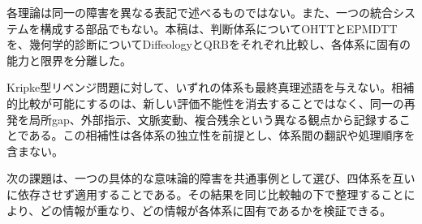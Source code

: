 \documentclass[a4paper,11pt]{ltjsarticle}
\theoremstyle{definition}
\theoremstyle{plain}
\begin{document}
各理論は同一の障害を異なる表記で述べるものではない。また、一つの統合システムを構成する部品でもない。本稿は、判断体系についてOHTTとEPMDTTを、幾何学的診断についてDiffeologyとQRBをそれぞれ比較し、各体系に固有の能力と限界を分離した。

Kripke型リベンジ問題に対して、いずれの体系も最終真理述語を与えない。相補的比較が可能にするのは、新しい評価不能性を消去することではなく、同一の再発を局所gap、外部指示、文脈変動、複合残余という異なる観点から記録することである。この相補性は各体系の独立性を前提とし、体系間の翻訳や処理順序を含まない。

次の課題は、一つの具体的な意味論的障害を共通事例として選び、四体系を互いに依存させず適用することである。その結果を同じ比較軸の下で整理することにより、どの情報が重なり、どの情報が各体系に固有であるかを検証できる。



\end{document}
